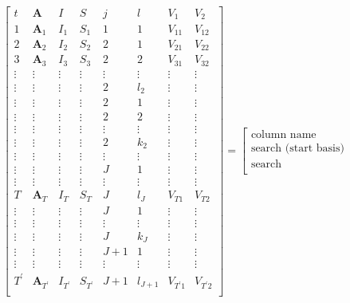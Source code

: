 \begin{equation}
\left[
\begin{array}{c|ccc|cc|cc}
t & \mathbf{A} & I & S & j &  l  & V_{1} & V_{2}\\
\hline
1 & \mathbf{A}_1 & I_1 & S_1 & 1 & 1 & V_{11} & V_{12}\\
\hline
2 & \mathbf{A}_2 & I_2 & S_2 & 2 & 1  & V_{21}  & V_{22}\\
3 & \mathbf{A}_3 & I_3 & S_3 & 2 & 2  & V_{31}  & V_{32}\\
\vdots & \vdots &\vdots &\vdots  &\vdots & \vdots &\vdots  &\vdots\\
\vdots & \vdots & \vdots &\vdots & 2 & l_2 & \vdots  & \vdots\\
\hline
\vdots &\vdots & \vdots &\vdots & 2  & 1& \vdots & \vdots\\
\vdots &\vdots &\vdots &\vdots & 2 & 2& \vdots &  \vdots\\
\vdots &\vdots &\vdots &\vdots &\vdots & \vdots & \vdots  &\vdots \\
\vdots &\vdots &\vdots &\vdots & 2 & k_2 &\vdots  & \vdots\\
\hline
\vdots &\vdots &\vdots &\vdots &\vdots & \vdots &\vdots &\vdots \\
\hline
\vdots & \vdots & \vdots &\vdots  & J &  1 & \vdots & \vdots \\
\vdots &\vdots &\vdots &\vdots &\vdots & \vdots &\vdots &\vdots \\
T & \mathbf{A}_T & I_T &S_T  & J &  l_{J} & V_{T1}& V_{T2}\\
\hline
\vdots &\vdots & \vdots &\vdots & J  & 1& \vdots & \vdots\\
\vdots &\vdots &\vdots &\vdots &\vdots & \vdots & \vdots  &\vdots \\
\vdots &\vdots &\vdots &\vdots & J & k_J &\vdots  & \vdots\\
\hline
\vdots& \vdots & \vdots & \vdots & J+1 & 1 & \vdots& \vdots\\
\vdots &\vdots &\vdots &\vdots &\vdots & \vdots &\vdots &\vdots \\
T^\prime & \mathbf{A}_{T^\prime} & I_{T^\prime} &S_{T^\prime}  & J+1 &  l_{J+1} & V_{T^\prime 1}& V_{T^\prime 2}\\
\end{array}
\right]
= 
\left[
\begin{array}{c}
\text{column name} \\
\hline
\text{search (start basis)} \\
\hline
\text{search} \\

\end{array}
\end{equation}
